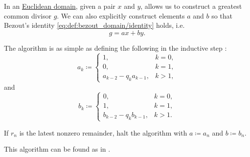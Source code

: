 \begin{algorithm}\label{alg:extended_euclidean_algorithm}
  In an \hyperref[def:euclidean_domain]{Euclidean domain}, given a pair \( x \) and \( y \),  allows us to construct a greatest common divisor \( g \). We can also explicitly construct elements \( a \) and \( b \) so that Bezout's identity \eqref{eq:def:bezout_domain/identity} holds, i.e.
  \begin{equation*}
    g = ax + by.
  \end{equation*}

  The algorithm is as simple as defining the following in the inductive step :
  \begin{equation*}
    a_k \coloneqq \begin{cases}
      1,                     &k = 0, \\
      0,                     &k = 1, \\
      a_{k-2} - q_k a_{k-1}, &k > 1,
    \end{cases}
  \end{equation*}
  and
  \begin{equation*}
    b_k \coloneqq \begin{cases}
      0,                     &k = 0, \\
      1,                     &k = 1, \\
      b_{k-2} - q_k b_{k-1}, &k > 1.
    \end{cases}
  \end{equation*}

  If \( r_n \) is the latest nonzero remainder, halt the algorithm with \( a \coloneqq a_n \) and \( b \coloneqq b_n \).
\end{algorithm}
\begin{comments}
  \item This algorithm can be found as  in \cite{notebook:code}.
\end{comments}
